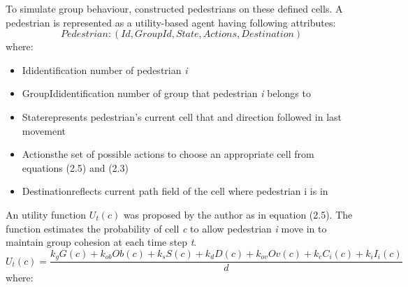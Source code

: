 \documentclass[a4paper,11pt,phdthesis,singlespace,twoside]{cssethesis}
\begin{document}
To simulate group behaviour, \cite{Bandini:2011} constructed pedestrians on these defined cells. A pedestrian is represented as a utility-based agent having following attributes:
\begin{equation}
Pedestrian: (Id,GroupId,State,Actions,Destination)
\end{equation}
where:
\begin{itemize}
  \item Id\textendash identification number of pedestrian \textit{i}
  \item GroupId\textendash identification number of group that pedestrian \textit{i} belongs to
  \item State\textendash represents pedestrian’s current cell that and direction followed in last movement
	\item Actions\textendash the set of possible actions to choose an appropriate cell from equations (2.5) and (2.3)
	\item Destination\textendash reflects current path field of the cell where pedestrian i is in
\end{itemize}
An utility function \begin{math}U_{t}(c)\end{math}  was proposed by the author as in equation (2.5). The function estimates the probability of cell \textit{c} to allow pedestrian \textit{i} move in to maintain group cohesion at each time step \textit{t}.
\begin{equation}
U_{t}(c)= \frac{k_{g}G(c)+k_{ob}Ob(c)+k_{s}S(c)+k_{d}D(c)+k_{ov}Ov(c)+k_{c}C_{i}(c)+k_{i}I_{i}(c)}{d}
\end{equation}
where:
\end{document}
